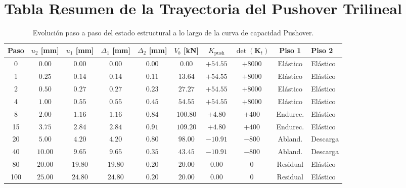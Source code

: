 \documentclass[11pt,letterpaper]{article}
\begin{document}
\section{Tabla Resumen de la Trayectoria del Pushover Trilineal}

\begin{table}[htbp]
\centering
\small
\caption{Evolución paso a paso del estado estructural a lo largo de la curva de capacidad Pushover.}
\label{tab:resumen_pasos}
\begin{tabularx}{\textwidth}{cccccccccX}
\toprule
\textbf{Paso} & \textbf{$u_2$ [mm]} & \textbf{$u_1$ [mm]} & \textbf{$\Delta_1$ [mm]} & \textbf{$\Delta_2$ [mm]} & \textbf{$V_b$ [kN]} & \textbf{$K_{\text{push}}$} & \textbf{$\det(\mathbf{K}_t)$} & \textbf{Piso 1} & \textbf{Piso 2} \\
\midrule
0  & $0.00$  & $0.00$  & $0.00$ & $0.00$ & $0.00$   & $+54.55$ & $+8000$ & Elástico & Elástico \\
1  & $0.25$  & $0.14$  & $0.14$ & $0.11$ & $13.64$  & $+54.55$ & $+8000$ & Elástico & Elástico \\
2  & $0.50$  & $0.27$  & $0.27$ & $0.23$ & $27.27$  & $+54.55$ & $+8000$ & Elástico & Elástico \\
4  & $1.00$  & $0.55$  & $0.55$ & $0.45$ & $54.55$  & $+54.55$ & $+8000$ & Elástico & Elástico \\
8  & $2.00$  & $1.16$  & $1.16$ & $0.84$ & $100.80$ & $+4.80$  & $+400$  & Endurec. & Elástico \\
15 & $3.75$  & $2.84$  & $2.84$ & $0.91$ & $109.20$ & $+4.80$  & $+400$  & Endurec. & Elástico \\
20 & $5.00$  & $4.20$  & $4.20$ & $0.80$ & $98.00$  & $-10.91$ & $-800$  & Abland.  & Descarga \\
40 & $10.00$ & $9.65$  & $9.65$ & $0.35$ & $43.45$  & $-10.91$ & $-800$  & Abland.  & Descarga \\
80 & $20.00$ & $19.80$ & $19.80$& $0.20$ & $20.00$  & $0.00$   & $0$     & Residual & Elástico \\
100& $25.00$ & $24.80$ & $24.80$& $0.20$ & $20.00$  & $0.00$   & $0$     & Residual & Elástico \\
\bottomrule
\end{tabularx}
\end{table}
\end{document}
